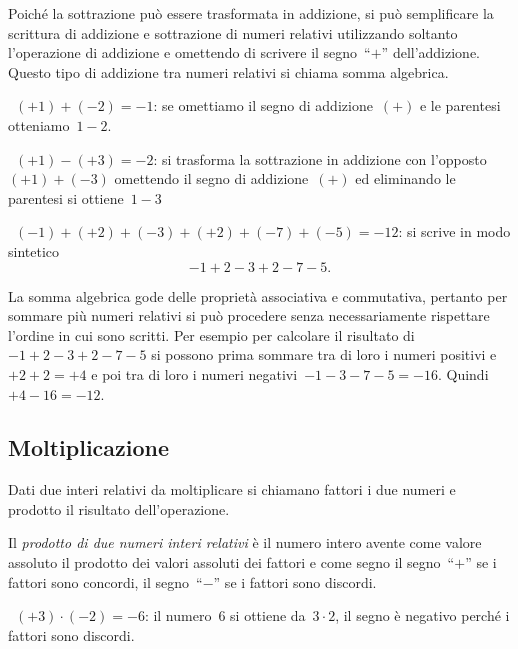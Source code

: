 Poiché la sottrazione può essere trasformata in addizione, si può 
semplificare 
la scrittura di addizione
e sottrazione di numeri relativi utilizzando soltanto l'operazione di 
addizione 
e omettendo di scrivere
il segno~``\(+\)'' dell'addizione. Questo tipo di addizione tra numeri 
relativi si 
chiama somma algebrica.

 \begin{esempio}
~\((+1)+(-2)=-1\): se omettiamo il segno di addizione~\((+)\) e le 
parentesi 
otteniamo~\(1-2\).
 \end{esempio}

\begin{esempio}
~\((+1)-(+3)=-2\): si trasforma la sottrazione in addizione con 
l'opposto~\((+1)+(-3)\) omettendo il segno
di addizione~\((+)\) ed eliminando le parentesi si ottiene~\(1-3\)
 \end{esempio}

\begin{esempio}
~\((-1)+(+2)+(-3)+(+2)+(-7)+(-5)=-12\): si scrive in modo sintetico 
\[-1+2-3+2-7-5.\]
 \end{esempio}


La somma algebrica gode delle proprietà associativa e commutativa, pertanto 
per 
sommare più numeri relativi
si può procedere senza necessariamente rispettare l'ordine in cui sono 
scritti. 
Per esempio per calcolare
il risultato di~\(-1+2-3+2-7-5\) si possono prima sommare tra di loro i 
numeri 
positivi e~\(+2+2=+4\)
e poi tra di loro i numeri negativi~\(-1-3-7-5=-16\). Quindi~\(+4-16=-12\).


\subsection{Moltiplicazione}

Dati due interi relativi da moltiplicare si chiamano fattori i due numeri e 
prodotto il
risultato dell'operazione.

Il \emph{prodotto di due numeri interi relativi} è il numero intero avente 
come 
valore assoluto il prodotto
dei valori assoluti dei fattori e come segno il segno~``\(+\)'' se i 
fattori sono 
concordi,
il segno~``\(-\)'' se i fattori sono discordi.

 \begin{esempio}
~\((+3)\cdot(-2)=-6\): il numero~6 si ottiene da~\(3\cdot2\), il segno è 
negativo 
perché i fattori sono discordi.
 \end{esempio}

